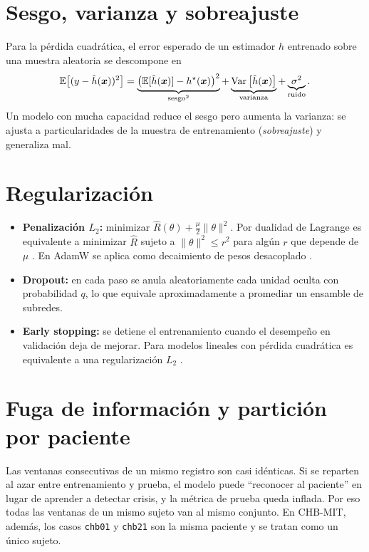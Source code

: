 
\section{Sesgo, varianza y sobreajuste}

Para la pérdida cuadrática, el error esperado de un estimador $\hat h$ entrenado sobre una muestra aleatoria se descompone en
\begin{equation}
\mathbb{E}\big[(y-\hat h(\bm x))^2\big] = \underbrace{\big(\mathbb{E}[\hat h(\bm x)] - h^\star(\bm x)\big)^2}_{\text{sesgo}^2} + \underbrace{\operatorname{Var}\big[\hat h(\bm x)\big]}_{\text{varianza}} + \underbrace{\sigma^2}_{\text{ruido}}.
\end{equation}
Un modelo con mucha capacidad reduce el sesgo pero aumenta la varianza: se ajusta a particularidades de la muestra de entrenamiento (\emph{sobreajuste}) y generaliza mal.


\section{Regularización}

\begin{itemize}
  \item \textbf{Penalización $L_2$:} minimizar $\hat R(\theta) + \frac\mu2\|\theta\|^2$. Por dualidad de Lagrange es equivalente a minimizar $\hat R$ sujeto a $\|\theta\|^2\le r^2$ para algún $r$ que depende de $\mu$ \parencite[sec.~7.2]{goodfellow2016}. En AdamW se aplica como decaimiento de pesos desacoplado \parencite{loshchilov2019}.
  \item \textbf{Dropout:} en cada paso se anula aleatoriamente cada unidad oculta con probabilidad $q$, lo que equivale aproximadamente a promediar un ensamble de subredes.
  \item \textbf{Early stopping:} se detiene el entrenamiento cuando el desempeño en validación deja de mejorar. Para modelos lineales con pérdida cuadrática es equivalente a una regularización $L_2$ \parencite[sec.~7.8]{goodfellow2016}.
\end{itemize}

\section{Fuga de información y partición por paciente}

Las ventanas consecutivas de un mismo registro son casi idénticas. Si se reparten al azar entre entrenamiento y prueba, el modelo puede ``reconocer al paciente'' en lugar de aprender a detectar crisis, y la métrica de prueba queda inflada. Por eso todas las ventanas de un mismo sujeto van al mismo conjunto. En CHB-MIT, además, los casos \texttt{chb01} y \texttt{chb21} son la misma paciente y se tratan como un único sujeto.

